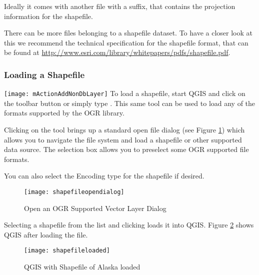 Ideally it comes with another file with a  suffix, that contains
the projection information for the shapefile.

There can be more files belonging to a shapefile dataset.
To have a closer look at this we recommend the technical specification for the shapefile format,
that can be found at \url{http://www.esri.com/library/whitepapers/pdfs/shapefile.pdf}.

\subsubsection{Loading a Shapefile}\label{sec:load_shapefile}
\texttt{[image: mActionAddNonDbLayer]} 
To load a shapefile, start
QGIS and click on the 
toolbar button or simply type . This same tool can be used to
load any of the formats supported by the OGR library.

Clicking on the tool brings up a standard open file dialog (see Figure
\ref{fig:openshapefile}) which allows you to navigate the file system and load
a shapefile or other supported data source. 
The selection box  allows you to preselect some OGR supported file formats.

You can also select the Encoding type for the shapefile if desired.

\begin{figure}[ht]
   \begin{center}
   \caption{Open an OGR Supported Vector Layer Dialog}\label{fig:openshapefile}\smallskip
   \texttt{[image: shapefileopendialog]}
\end{center} 
\end{figure}

Selecting a shapefile from the list and clicking  loads it into QGIS. Figure
\ref{fig:loadedshapefile} shows QGIS after loading the  file.

\begin{figure}[ht]
   \begin{center}
   \caption{QGIS with Shapefile of Alaska loaded}\label{fig:loadedshapefile}\smallskip
   \texttt{[image: shapefileloaded]}
\end{center} 
\end{figure}

\begin{Tip}\caption{\textsc{Layer Colors}}
\end{Tip}

